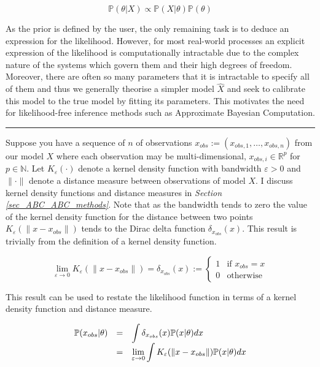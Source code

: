 \documentclass[11pt,a4paper]{article}
\newcommand*{\prob}{\mathbb{P}}
\theoremstyle{break}
\begin{document}
  \[ \prob(\theta|X)\propto\prob(X|\theta)\prob(\theta) \]

  \par As the prior is defined by the user, the only remaining task is to deduce an expression for the likelihood. However, for most real-world processes an explicit expression of the likelihood is computationally intractable due to the complex nature of the systems which govern them and their high degrees of freedom. Moreover, there are often so many parameters that it is intractable to specify all of them and thus we generally theorise a simpler model $\hat{X}$ and seek to calibrate this model to the true model by fitting its parameters. This motivates the need for likelihood-free inference methods such as Approximate Bayesian Computation.

  \begin{center}
    \noindent\rule{.8\textwidth}{0.4pt}
  \end{center}

  \noindent Suppose you have a sequence of $n$ of observations $x_{obs}:=(x_{obs,1},\dots,x_{obs,n})$ from our model $X$ where each observation may be multi-dimensional, $x_{obs,i}\in\mathbb{R}^p$ for $p\in\mathbb{N}$. Let $K_\varepsilon(\cdot)$ denote a kernel density function with bandwidth $\varepsilon>0$ and $\|\cdot\|$ denote a distance measure between observations of model $X$. I discuss kernel density functions and distance measures in \textit{Section \ref{sec_ABC_ABC_methods}}. Note that as the bandwidth tends to zero the value of the kernel density function for the distance between two points $K_\varepsilon(\|x-x_{obs}\|)$ tends to the Dirac delta function $\delta_{x_{obs}}(x)$. This result is trivially from the definition of a kernel density function.

  \begin{equation}
    \lim_{\varepsilon\to0}K_{\varepsilon}(\|x-x_{obs}\|)=\delta_{x_{obs}}(x):=\begin{cases}1&\text{if }x_{obs}=x\\0&\text{otherwise}\end{cases} \label{eqn_limit_of_kernel_and_distance}
  \end{equation}

  \par This result can be used to restate the likelihood function in terms of a kernel density function and distance measure.

  \[
    \everymath={\displaystyle}
    \begin{array}{rcl}
      \prob(x_{obs}|\theta)&=&\int\delta_{x_{obs}}(x)\prob(x|\theta)dx\\
      &=&\lim_{\varepsilon\to0}\int K_\varepsilon(\|x-x_{obs}\|)\prob(x|\theta)dx
    \end{array}
  \]
\end{document}

